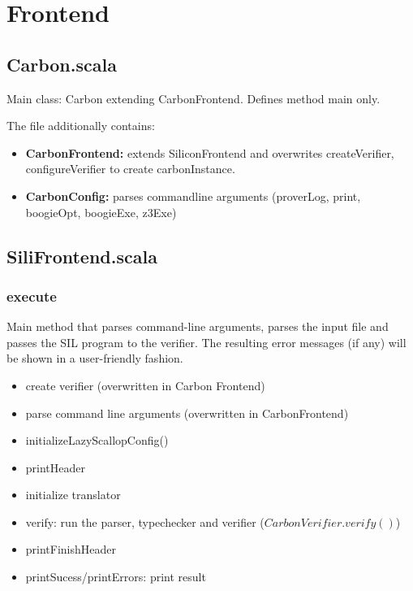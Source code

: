 \documentclass[12pt]{article}
\begin{document}
\maketitle

\section{Frontend}

\subsection{Carbon.scala}
Main class: Carbon extending CarbonFrontend. Defines method main only.


The file additionally contains:
\begin{itemize}
\item \textbf{CarbonFrontend:} extends SiliconFrontend and overwrites createVerifier, configureVerifier to create carbonInstance.
\item \textbf{CarbonConfig:} parses commandline arguments (proverLog, print, boogieOpt, boogieExe, z3Exe)
\end{itemize}

\subsection{SiliFrontend.scala}
\subsubsection{execute}
Main method that parses command-line arguments, parses the input file and passes the  SIL program to the verifier. The resulting error messages (if any) will be shown in a user-friendly fashion.
\begin{itemize}
\item create verifier (overwritten in Carbon Frontend)
\item parse command line arguments (overwritten in CarbonFrontend)
\item initializeLazyScallopConfig()
\item printHeader
\item initialize translator
\item verify: run the parser, typechecker and verifier ($CarbonVerifier.verify()$)
\item printFinishHeader
\item printSucess/printErrors: print result
\end{itemize}
\end{document}
